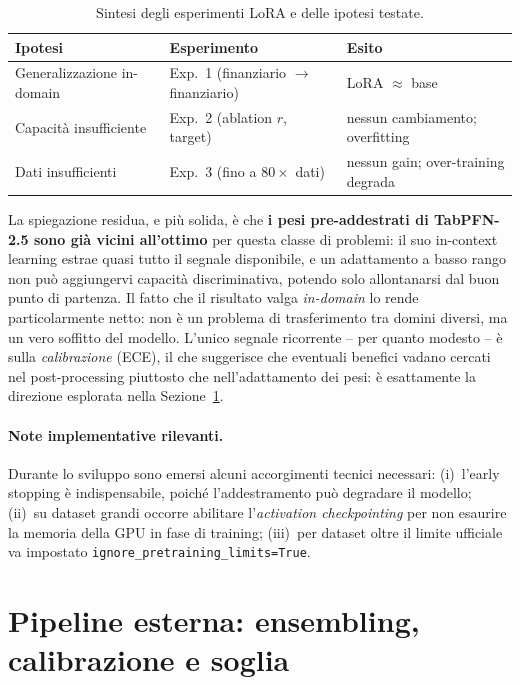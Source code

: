 \documentclass[11pt,a4paper]{article}
\begin{document}
\begin{table}[h]
\centering
\caption{Sintesi degli esperimenti LoRA e delle ipotesi testate.}
\label{tab:summary}
\small
\begin{tabular}{lll}
\toprule
Ipotesi & Esperimento & Esito \\
\midrule
Generalizzazione in-domain & Exp.~1 (finanziario $\to$ finanziario) & LoRA $\approx$ base \\
Capacità insufficiente & Exp.~2 (ablation $r$, target) & nessun cambiamento; overfitting \\
Dati insufficienti & Exp.~3 (fino a $80\times$ dati) & nessun gain; over-training degrada \\
\bottomrule
\end{tabular}
\end{table}

La spiegazione residua, e più solida, è che \textbf{i pesi pre-addestrati di
TabPFN-2.5 sono già vicini all'ottimo} per questa classe di problemi: il suo
in-context learning estrae quasi tutto il segnale disponibile, e un adattamento a
basso rango non può aggiungervi capacità discriminativa, potendo solo
allontanarsi dal buon punto di partenza. Il fatto che il risultato valga
\emph{in-domain} lo rende particolarmente netto: non è un problema di
trasferimento tra domini diversi, ma un vero soffitto del modello. L'unico
segnale ricorrente -- per quanto modesto -- è sulla \emph{calibrazione} (ECE), il
che suggerisce che eventuali benefici vadano cercati nel post-processing piuttosto
che nell'adattamento dei pesi: è esattamente la direzione esplorata nella
Sezione~\ref{sec:pipeline}.

\paragraph{Note implementative rilevanti.} Durante lo sviluppo sono emersi alcuni
accorgimenti tecnici necessari: (i)~l'early stopping è indispensabile, poiché
l'addestramento può degradare il modello; (ii)~su dataset grandi occorre
abilitare l'\emph{activation checkpointing} per non esaurire la memoria della GPU
in fase di training; (iii)~per dataset oltre il limite ufficiale va impostato
\texttt{ignore\_pretraining\_limits=True}.

\section{Pipeline esterna: ensembling, calibrazione e soglia}
\label{sec:pipeline}
\end{document}
